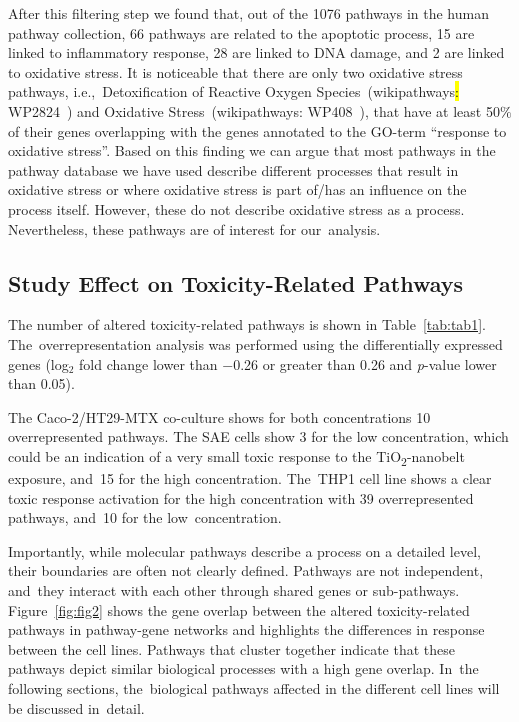 \documentclass[ijms,article,accept,moreauthors,pdftex]{Definitions/mdpi}
\begin{document}
\begin{paracol}{2}
After this filtering step we found that, out of the 1076 pathways in the human pathway collection, 66 pathways are related to the apoptotic process, 15 are linked to inflammatory response, 28 are linked to DNA damage, and 2 are linked to oxidative stress.
It is noticeable that there are only two oxidative stress pathways, i.e.,~Detoxification of Reactive Oxygen Species~(wikipathways\hl{: } %
WP2824~\cite{WP2824}) and Oxidative Stress~(wikipathways: WP408~\cite{WP408}), that have at least 50$\%$ of their genes overlapping with the genes annotated to the GO-term ``response to oxidative stress''. Based on this finding we can argue that most pathways in the pathway database we have used describe different processes that result in oxidative stress or where oxidative stress is part of/has an influence on the process itself. However, these do not describe oxidative stress as a process.  Nevertheless, these pathways are of interest for our~analysis. 

\subsection{Study Effect on Toxicity-Related Pathways}
The number of altered toxicity-related pathways is shown in Table~\ref{tab:tab1}. The~overrepresentation analysis was performed using the differentially expressed genes (log$_{2}$ fold change lower than $-$0.26 or greater than 0.26 and \emph{p}-value lower than 0.05). 

The {Caco-2/HT29-MTX co-culture} shows for both concentrations 10 overrepresented pathways. The SAE {cells} show 3 for the low concentration, which could be an indication of a very small toxic response to the TiO\textsubscript{2}-nanobelt exposure, and~15 for the high concentration. The~THP1 cell line shows a clear toxic response activation for the high concentration with 39 overrepresented pathways, and~10 for the low~concentration.



Importantly, while molecular pathways describe a process on a detailed level, their boundaries are often not clearly defined. Pathways are not independent, and~they interact with each other through shared genes or sub-pathways. Figure~\ref{fig:fig2} shows the gene overlap between the altered toxicity-related pathways in pathway-gene networks and highlights the differences in response between the cell lines. Pathways that cluster together indicate that these pathways depict similar biological processes with a high gene overlap. In~the following sections, the~biological pathways affected in the different cell lines will be discussed in~detail.





\end{paracol}
\end{document}

